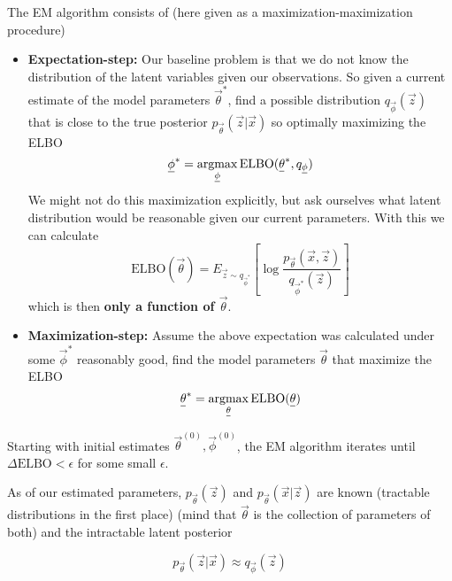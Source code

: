 The EM algorithm consists of (here given as a maximization-maximization procedure)
\begin{itemize}
    \item \textbf{Expectation-step:} Our baseline problem is that we do not know the distribution of the
    latent variables given our observations. So given a current estimate of the model parameters $\vec{\theta}^*$, find a possible
    distribution $q_{\vec{\phi}}(\vec{z})$ that is close to the true posterior $p_{\vec{\theta}}(\vec{z} | \vec{x})$
    so optimally maximizing the ELBO
    \begin{equation}
        \vec{\phi}^* = \argmax_{\vec{\phi}} \text{ELBO}(\vec{\theta}^*, q_{\vec{\phi}})
    \end{equation}
    We might not do this maximization explicitly, but ask ourselves what latent distribution would be reasonable given our current parameters.
    With this we can calculate
    \begin{equation}
        \text{ELBO}(\vec{\theta}) = E_{\vec{z} \sim q_{\vec{\phi}^*}} \left[ \log \frac{p_\vec{\theta}(\vec{x},\vec{z})}{q_{\vec{\phi}^*}(\vec{z})} \right]
    \end{equation}
    which is then \textbf{only a function of $\vec{\theta}$}.
    \item \textbf{Maximization-step:} Assume the above expectation was calculated under some $\vec{\phi}^*$ reasonably good, find
    the model parameters $\vec{\theta}$ that maximize the ELBO
    \begin{equation}
        \vec{\theta}^* = \argmax_{\vec{\theta}} \text{ELBO}(\vec{\theta})
    \end{equation}
\end{itemize}

Starting with initial estimates $\vec{\theta}^{(0)}, \vec{\phi}^{(0)}$, the EM algorithm iterates
until $\Delta \text{ELBO} < \epsilon$ for some small $\epsilon$.


As of our estimated parameters, $p_\vec{\theta}(\vec{z})$ and $p_\vec{\theta}(\vec{x} | \vec{z})$ are known
(tractable distributions in the first place) (mind that $\vec{\theta}$ is the collection
of parameters of both) and the intractable latent posterior

\begin{equation}
    p_\vec{\theta}(\vec{z} | \vec{x}) \approx q_{\vec{\phi}}(\vec{z})
\end{equation}


